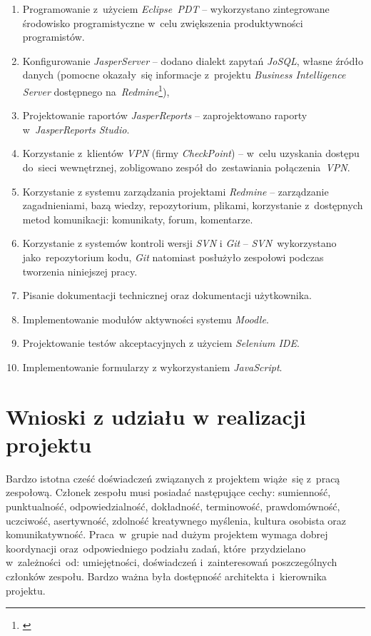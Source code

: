 \begin{enumerate}
\item Programowanie z~użyciem \textit{Eclipse~PDT} -- wykorzystano zintegrowane środowisko programistyczne w~celu zwiększenia produktywności programistów.
\item Konfigurowanie \textit{JasperServer} -- dodano dialekt zapytań \textit{JoSQL}, własne źródło danych (pomocne okazały~się informacje z~projektu \textit{Business Intelligence Server} dostępnego na~\textit{Redmine}\footnote{\cite{Redmine:ProjDocs}}),
\item Projektowanie raportów \textit{JasperReports} -- zaprojektowano raporty w~\textit{JasperReports Studio}.
\item Korzystanie z~klientów \textit{VPN} (firmy \textit{CheckPoint}) -- w~celu uzyskania dostępu do~sieci wewnętrznej, zobligowano zespół do~zestawiania połączenia~\textit{VPN}.
\item Korzystanie z systemu zarządzania projektami \textit{Redmine} -- zarządzanie zagadnieniami, bazą wiedzy, repozytorium, plikami, korzystanie z~dostępnych metod komunikacji: komunikaty, forum, komentarze.
\item Korzystanie z systemów kontroli wersji \textit{SVN} i \textit{Git} -- \textit{SVN}~wykorzystano jako~repozytorium kodu, \textit{Git} natomiast posłużyło zespołowi podczas tworzenia niniejszej pracy.
\item Pisanie dokumentacji technicznej oraz dokumentacji użytkownika.
\item Implementowanie modułów aktywności systemu \textit{Moodle}.
\item Projektowanie testów akceptacyjnych z użyciem \textit{Selenium IDE}.
\item Implementowanie formularzy z wykorzystaniem \textit{JavaScript}.
\end{enumerate}

\section{Wnioski z udziału w realizacji projektu}
\label{Chapter82}

Bardzo istotna cześć doświadczeń związanych z projektem wiąże~się z~pracą zespołową. Członek zespołu musi posiadać następujące cechy: sumienność, punktualność, odpowiedzialność, dokładność, terminowość, prawdomówność, uczciwość, asertywność, zdolność kreatywnego myślenia, kultura osobista oraz komunikatywność. Praca~w~grupie nad dużym projektem wymaga dobrej koordynacji oraz~odpowiedniego podziału zadań, które~przydzielano w~zależności~od: umiejętności, doświadczeń i~zainteresowań poszczególnych członków zespołu. Bardzo ważna była dostępność architekta i~kierownika projektu.

